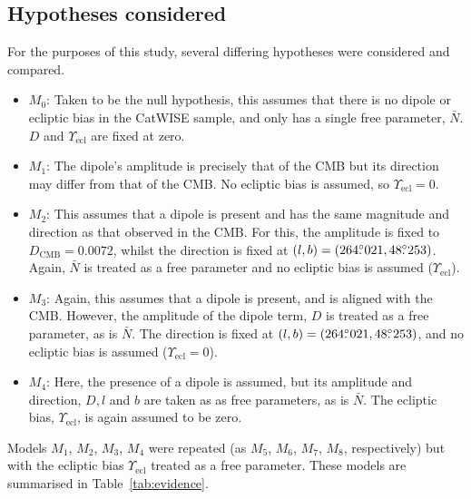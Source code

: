 \documentclass[fleqn,usenatbib]{mnras}
\def\mrm#1{\mathrm{#1}}
\newcommand{\dotdeg}{\rlap{.}^\circ}
\begin{document}
\subsection{Hypotheses considered}
For the purposes of this study, several differing hypotheses were considered and compared.
\begin{itemize}
\item $M_0$: Taken to be the null hypothesis, this assumes that there is no dipole or ecliptic bias in the CatWISE sample, and only has a single free parameter, $\bar{N}$. $D$ and $\Upsilon_\mrm{ecl}$ are fixed at zero.
\item $M_1$: The dipole's amplitude is precisely that of the CMB
but its direction may differ from that of the CMB. No ecliptic bias is assumed, so $\Upsilon_\mrm{ecl}=0$.
\item $M_2$: This assumes that a dipole is present and has the same magnitude and direction as that observed in the CMB. For this, the amplitude is fixed to $D_\text{CMB} = 0.0072$, whilst the direction is 
fixed at $(l,b) =  (264\dotdeg021,48\dotdeg253)$.
Again, $\bar{N}$ is treated as a free parameter and no ecliptic bias is assumed ($\Upsilon_\mrm{ecl}$).
\item $M_3$: Again, this assumes that a dipole is present, and is aligned with the CMB. However, the amplitude of the dipole term, $D$ is treated as a free parameter, as is $\bar{N}$. The direction is 
fixed at $(l,b) =  (264\dotdeg021,48\dotdeg253)$, and no ecliptic bias is assumed ($\Upsilon_\mrm{ecl}=0$). 
\item $M_4$: Here, the presence of a dipole is assumed, but its amplitude and direction, $D, l$ and $b$ are taken as as free parameters, as is $\bar{N}$. The ecliptic bias, $\Upsilon_\mrm{ecl}$, is again assumed to be zero. 
\end{itemize}
Models $M_1$, $M_2$, $M_3$, $M_4$ were repeated (as $M_5$, $M_6$, $M_7$, $M_8$, respectively) but with the ecliptic bias $\Upsilon_\mrm{ecl}$ treated as a free parameter.
These models are summarised in Table~\ref{tab:evidence}.
\end{document}
